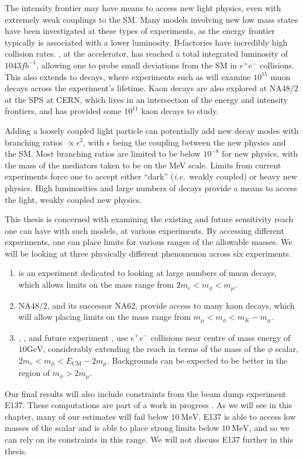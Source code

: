 \label{chapter:experiments}

The intensity frontier may have means to access new light physics, even with extremely weak couplings to the SM.
Many models involving new low mass states have been investigated at these types of experiments, as the energy frontier typically is associated with a lower luminosity.
B-factories have incredibly high collision rates.
\belle, at the \kekb accelerator, has reached a total integrated luminosity of $1043fb^{-1}$, allowing one to probe small deviations from the SM in $e^+ e^-$ collisions.
This also extends to decays, where experiments such as \mueee will examine $10^{15}$ muon decays across the experiment's lifetime.
Kaon decays are also explored at NA48/2 at the SPS at CERN, which lives in an intersection of the energy and intensity frontiers, and has provided some $10^{11}$ kaon decays to study.

Adding a loosely coupled light particle can potentially add new decay modes with branching ratios $\propto \epsilon^2$, with $\epsilon$ being the coupling between the new physics and the SM.
Most branching ratios are limited to be below $10^{-8}$ for new physics, with the mass of the mediators taken to be on the MeV scale.
Limits from current experiments force one to accept either ``dark'' ({\em i.e.}\ weakly coupled) or heavy new physics.
High luminosities and large numbers of decays provide a means to access the light, weakly coupled new physics.

This thesis is concerned with examining the existing and future sensitivity reach one can have with such models, at various experiments.
By accessing different experiments, one can place limits for various ranges of the allowable masses.
We will be looking at three physically different phenomenon across six experiments.
\begin{enumerate}
    \item \mueee is an experiment dedicated to looking at large numbers of muon decays, which allows limits on the mass range from $2 m_e < m_\phi < m_\mu$.
    \item NA48/2, and its successor NA62, provide access to many kaon decays, which will allow placing limits on the mass range from $m_\mu < m_\phi < m_K - m_\mu$.
    \item \babar, \belle, and future experiment \belletwo, use $e^+ e^-$ collisions near centre of mass energy of $10\textrm{GeV}$, considerably extending the reach in terms of the mass of the $\phi$ scalar, $2m_e < m_\phi < E_\textrm{CM} - 2 m_\mu$. Backgrounds can be expected to be better in the region of $m_\phi > 2 m_\mu$.
\end{enumerate}

Our final results will also include constraints from the beam dump experiment E137.
These computations are part of a work in progress \cite{Batell:2015unpub}.
As we will see in this chapter, many of our estimates will fail below $10~\textrm{MeV}$.
E137 is able to access low masses of the scalar and is able to place strong limits below $10~\textrm{MeV}$, and so we can rely on its constraints in this range.
We will not discuss E137 further in this thesis.




